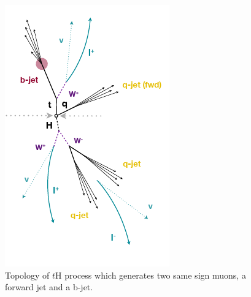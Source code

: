 	\begin{figure}[ht]
		\centering
		\includegraphics[scale=1]{Chapter1/jet.png}
		\caption{Topology of $t$H process which generates two same sign muons, a forward jet and a b-jet.} 
		\label{jet}
	\end{figure}
\pagebreak
